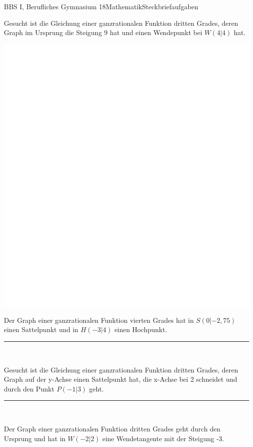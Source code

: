 \documentclass[oneside,openany,headings=optiontotoc,11pt,numbers=noenddot]{scrreprt}
\begin{document}
		\begin{worksheet}{BBS I, Berufliches Gymnasium 18}{Mathematik}{Steckbriefaufgaben}
			\begin{framed}
				\noindent
				\onehalfspacing
				Gesucht ist die Gleichung einer ganzrationalen Funktion dritten Grades, deren Graph im Ursprung die Steigung 9 hat und einen Wendepunkt bei \(W(4|4)\) hat.\\
				\par\bigskip\noindent
				\includegraphics[width=1.1\textwidth]{../../empty.jpg}\\
				\par\bigskip\noindent
				Der Graph einer ganzrationalen Funktion vierten Grades hat in \(S(0|-2,75)\) einen Sattelpunkt und in \(H(-3|4)\) einen Hochpunkt.
				\par\bigskip\noindent
				\rule{\textwidth}{0.1pt}\\
				\par\bigskip\noindent
				Gesucht ist die Gleichung einer ganzrationalen Funktion dritten Grades, deren Graph auf der y-Achse einen Sattelpunkt hat, die x-Achse bei 2 schneidet und durch den Punkt \(P(-1|3)\) geht.\\
				\par\bigskip\noindent
				\rule{\textwidth}{0.1pt}\\
				\par\bigskip\noindent
				Der Graph einer ganzrationalen Funktion dritten Grades geht durch den Ursprung und hat in \(W(-2|2)\) eine Wendetangente mit der Steigung -3.\\
			\end{framed}
		\end{worksheet}
\end{document}
